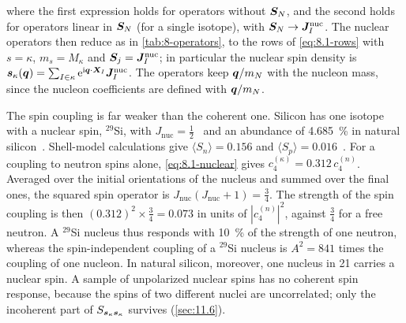 where the first expression holds for operators without $\bm{S}_N$, and the second holds for operators linear in $\bm{S}_N$ (for a single isotope), with $\bm{S}_N \to \bm{J}^{\mathrm{nuc}}_I$. The nuclear operators then reduce as in \cref{tab:8-operators}, to the rows of \cref{eq:8.1-rows} with $s = \kappa$, $m_s = M_\kappa$ and $\bm{S}_j = \bm{J}^{\mathrm{nuc}}_I$; in particular the nuclear spin density is $\bm{s}_\kappa(\bm{q}) = \sum_{I\in\kappa}\mathrm{e}^{\mathrm{i}\bm{q}\cdot\bm{X}_I}\bm{J}^{\mathrm{nuc}}_I$. The operators keep $\bm{q}/m_N$ with the nucleon mass, since the nucleon coefficients are defined with $\bm{q}/m_N$.

The spin coupling is far weaker than the coherent one. Silicon has one isotope with a nuclear spin, $^{29}$Si, with $J_{\mathrm{nuc}} = \frac12$~\cite[Fig.~5]{klos2013large} and an abundance of \SI{4.685}{\percent} in natural silicon~\cite{meija2016isotopic}. Shell-model calculations give $\langle S_n\rangle = 0.156$ and $\langle S_p\rangle = 0.016$~\cite[Table~III]{klos2013large}. For a coupling to neutron spins alone, \cref{eq:8.1-nuclear} gives $c_4^{(\kappa)} = 0.312\,c_4^{(n)}$. Averaged over the initial orientations of the nucleus and summed over the final ones, the squared spin operator is $J_{\mathrm{nuc}}(J_{\mathrm{nuc}} + 1) = \frac34$. The strength of the spin coupling is then $(0.312)^2 \times \frac34 = 0.073$ in units of $|c_4^{(n)}|^2$, against $\frac34$ for a free neutron. A $^{29}$Si nucleus thus responds with \SI{10}{\percent} of the strength of one neutron, whereas the spin-independent coupling of a $^{29}$Si nucleus is $A^2 = 841$ times the coupling of one nucleon. In natural silicon, moreover, one nucleus in 21 carries a nuclear spin. A sample of unpolarized nuclear spins has no coherent spin response, because the spins of two different nuclei are uncorrelated; only the incoherent part of $S_{\bm{s}_\kappa\bm{s}_\kappa}$ survives (\cref{sec:11.6}).

